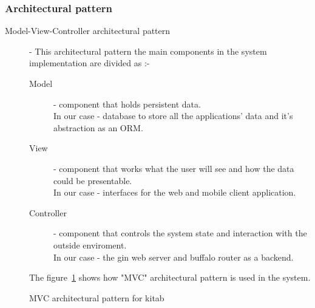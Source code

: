 		\subsubsection{Architectural pattern}

		\begin{description}
			\item[Model-View-Controller architectural pattern] - This architectural pattern the main components in the system implementation are divided as :-
			\begin{description}
				\item[Model] - component that holds persistent data. \\
				In our case - database to store all the applications' data and it's abstraction as an ORM.
				\item[View] - component that works what the user will see and how the data could be presentable.\\
				In our case - interfaces for the web and mobile client application.
				\item[Controller] - component that controls the system state and interaction with the outside enviroment.\\
				In our case - the gin web server and buffalo router as a backend.
			\end{description}
			The figure~\ref{dia_mvc_arch_pattern} shows how "MVC" architectural pattern is used in the system.
		\end{description}

		\begin{figure}[H]
		\begin{center}

		\caption{MVC architectural pattern for kitab}
		\label{dia_mvc_arch_pattern}

		\end{center}
		\end{figure}

